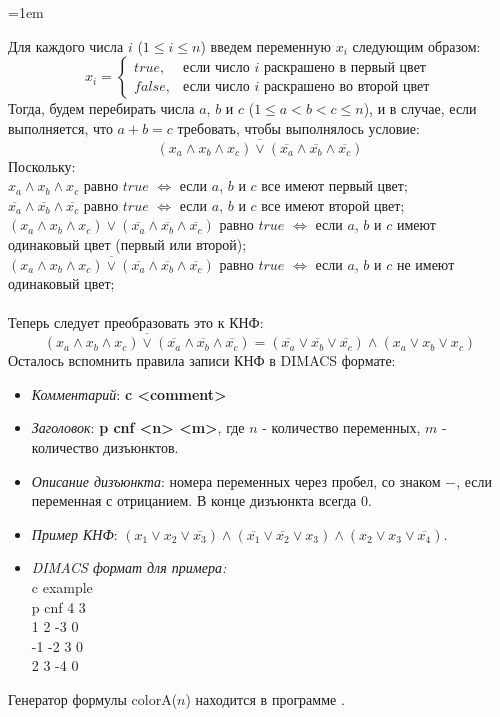 \documentclass[12pt]{extreport}
\theoremstyle{definiton}
\theoremstyle{definition}
\theoremstyle{definition}
\let\leq\leqslant
\newcommand{\solution}[2][\color{myblue}Решение]{
\medskip
	\noindent{\bfseries #1 }{{\color{myblue}\bfseries #2:}}
}
\newenvironment{blockquote}{%
  \par%
  \medskip
  \leftskip=1em%
  \noindent}{%
  \par\medskip}
\begin{document}
\solution{1}
\begin{blockquote}
{\color{myblue}
\noindent Для каждого числа $i$ ($1 \leq i \leq n$) введем переменную $x_i$ следующим образом:
\begin{equation*}
x_i = 
 \begin{cases}
   true, &\text{если число $i$ раскрашено в первый цвет}\\
   false, &\text{если число $i$ раскрашено во второй цвет}
 \end{cases}
\end{equation*}
Тогда, будем перебирать числа $a$, $b$ и $c$ ($1 \leq a < b < c \leq n$), и в случае, если выполняется, что $a + b = c$ требовать, чтобы выполнялось условие:
$$\overline{(x_a \wedge x_b \wedge x_c) \vee (\overline{x_a} \wedge \overline{x_b} \wedge \overline{x_c})}$$
Поскольку:\\
$x_a \wedge x_b \wedge x_c$ равно $true$ $\Leftrightarrow$ если $a$, $b$ и $c$ все имеют первый цвет;\\ $\overline{x_a} \wedge \overline{x_b} \wedge \overline{x_c}$ равно $true$ $\Leftrightarrow$ если $a$, $b$ и $c$ все имеют второй цвет;\\
$(x_a \wedge x_b \wedge x_c) \vee (\overline{x_a} \wedge \overline{x_b} \wedge \overline{x_c})$ равно $true$ $\Leftrightarrow$ если $a$, $b$ и $c$ имеют одинаковый цвет (первый или второй);\\
$\overline{(x_a \wedge x_b \wedge x_c) \vee (\overline{x_a} \wedge \overline{x_b} \wedge \overline{x_c})}$ равно $true$ $\Leftrightarrow$ если $a$, $b$ и $c$ не имеют одинаковый цвет;\\
\\
Теперь следует преобразовать это к КНФ:
$$\overline{(x_a \wedge x_b \wedge x_c) \vee (\overline{x_a} \wedge \overline{x_b} \wedge \overline{x_c})} = (\overline{x_a} \vee \overline{x_b} \vee \overline{x_c}) \wedge (x_a \vee x_b \vee x_c)$$
Осталось вспомнить правила записи КНФ в DIMACS формате:
\begin{itemize}
    \item \textit{Комментарий}: \textbf{c <comment>}
    \item \textit{Заголовок}: \textbf{p cnf <n> <m>}, где $n$ - количество переменных, $m$ - количество дизъюнктов.
    \item \textit{Описание дизъюнкта}: номера переменных через пробел, со знаком $-$, если переменная с отрицанием. В конце дизъюнкта всегда 0.
    \item \textit{Пример КНФ}: $(x_1 \vee x_2 \vee \overline{x_3}) \wedge (\overline{x_1} \vee \overline{x_2} \vee x_3) \wedge (x_2 \vee x_3 \vee \overline{x_4})$.
    \item \textit{DIMACS формат для примера:}\\
    c example\\
    p cnf 4 3\\
    1 2 -3 0\\
    -1 -2 3 0\\
    2 3 -4 0\\
\end{itemize}
Генератор формулы colorA($n$) находится в программе {}.
}
\end{blockquote}
\end{document}
